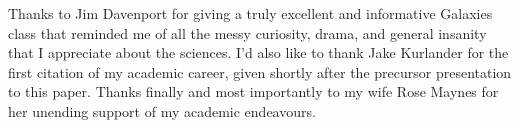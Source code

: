 \documentclass[preprint2]{aastex631}
\begin{document}
\begin{acknowledgements}
Thanks to Jim Davenport for giving a truly excellent and informative Galaxies class that reminded me of all the messy curiosity, drama, and general insanity that I appreciate about the sciences. I'd also like to thank Jake Kurlander for the first citation of my academic career, given shortly after the precursor presentation to this paper. Thanks finally and most importantly to my wife Rose Maynes for her unending support of my academic endeavours.
\end{acknowledgements}



{}



\end{document}
